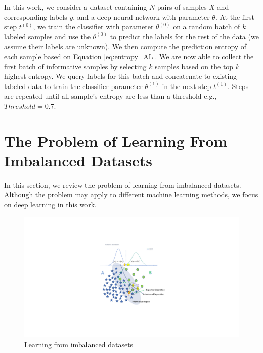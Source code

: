 \documentclass[final,5p,times, twocolumn]{elsarticle}
\begin{document}
	In this work, we consider a dataset containing $N$ pairs of samples $X$ and corresponding labels $y$, and a deep neural network with parameter $\theta$. At the first step $t^{(0)}$, we train the classifier with parameter $\theta^{(0)}$ on a random batch of $k$ labeled samples and use the $\theta^{(0)}$ to predict the labels for the rest of the data (we assume their labels are unknown). We then compute the prediction entropy of each sample based on Equation \ref{eq:entropy_AL}. We are now able to collect the first batch of informative samples by selecting $k$ samples based on the top $k$ highest entropy. We query labels for this batch and concatenate to existing labeled data to train the classifier parameter $\theta^{(1)}$ in the next step $t^{(1)}$. Steps are repeated until all sample's entropy are less than a threshold e.g., $Threshold=0.7$.  
	
	\section{The Problem of Learning From Imbalanced Datasets}
	\label{sec:problem}
	In this section, we review the problem of learning from imbalanced datasets. Although the problem may apply to different machine learning methods, we focus on deep learning in this work. 
	
	\begin{figure}[t!]
		\includegraphics[width=\linewidth, trim=300 150 310 120,clip]{Figures/proplem.pdf}
		\caption{Learning from imbalanced datasets}
		\label{fig:problem}
	\end{figure}
	
\end{document}
